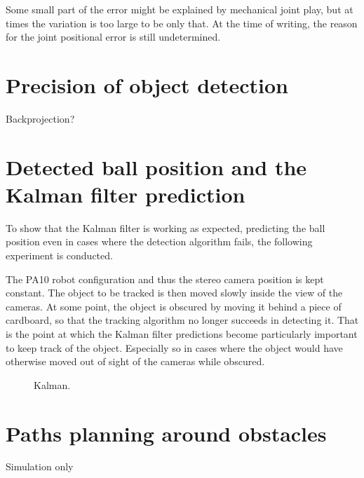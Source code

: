 Some small part of the error might be explained by mechanical joint play, but at times the variation is too large to be only that.
At the time of writing, the reason for the joint positional error is still undetermined.



\section{Precision of object detection}
Backprojection?


\section{Detected ball position and the Kalman filter prediction}
To show that the Kalman filter is working as expected,
predicting the ball position even in cases where the detection algorithm fails, the following experiment is conducted.

The PA10 robot configuration and thus the stereo camera position is kept constant.
The object to be tracked is then moved slowly inside the view of the cameras. At some point, the object is obscured by moving it behind a piece of cardboard, so that the tracking algorithm no longer succeeds in detecting it.
That is the point at which the Kalman filter predictions become particularly important to keep track of the object. Especially so in cases where the object would have otherwise moved out of sight of the cameras while obscured.

\begin{figure}[htb]
    \centering
    \resizebox{\columnwidth}{!}{%
        
    }
    \caption{Kalman.}
    \label{fig:ball_kalman_3d}
\end{figure}

\section{Paths planning around obstacles}
Simulation only
